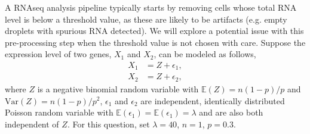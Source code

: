 \documentclass[11pt]{exam}
\newtheorem{theorem}{Theorem}
\begin{document}
\begin{questions}
\begin{parts}


\end{parts}

\newpage
\question[12] 
A RNAseq analysis pipeline typically starts by removing cells  whose total RNA level is below a threshold value, as these are likely to be artifacts (e.g. empty droplets with spurious RNA detected). We will explore a potential issue with this pre-processing step when the threshold value is not chosen with care. Suppose the expression level of two genes, $X_1$ and $X_2$, can be modeled as follows,
\begin{equation*}
    \begin{split}
        X_1 &= Z + \epsilon_1, \\
        X_2 &= Z + \epsilon_2,
    \end{split}
\end{equation*}
where $Z$ is a negative binomial random variable with $\mathbb{E}(Z) = n(1-p)/p$ and $\mathrm{Var}(Z)= n(1-p)/p^2$, $\epsilon_1$ and $\epsilon_2$ are independent, identically distributed Poisson random variable with $\mathbb{E}(\epsilon_1) = \mathbb{E}(\epsilon_1) = \lambda$ and are also both independent of $Z$. For this question, set $\lambda = 40$, $n=1$, $p=0.3$.\\


\end{questions}
\end{document}
